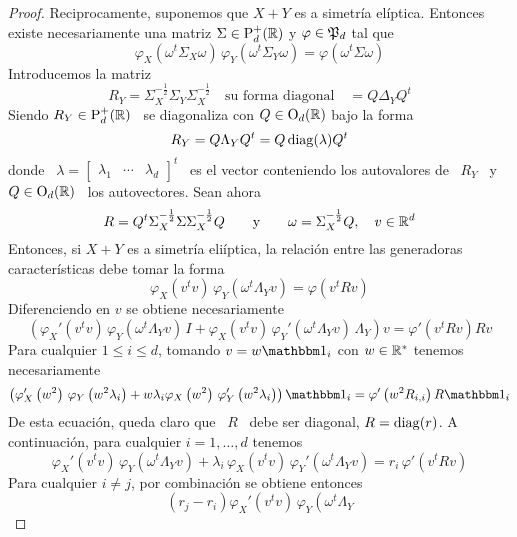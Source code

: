 \begin{proof}
  Reciprocamente,  suponemos  que $X+Y$  es  a  simetr\'ia el\'iptica.  Entonces
  existe  necesariamente una matriz  $\Sigma \in  \mathrm{P}_d^+(\mathbb{R})$ y  $\varphi \in
  \mathfrak{P}_d$ tal que
  \[
  \varphi_X\left(  \omega^t \Sigma_X  \omega\right) \,  \varphi_Y\left( \omega^t
    \Sigma_Y \omega\right) = \varphi\left( \omega^t \Sigma \omega\right)
  \]
  Introducemos la matriz
  \[
  R_Y  = \Sigma_X^{-\frac12} \Sigma_Y  \Sigma_X^{-\frac12} \quad  \mbox{su forma
    diagonal} \quad = Q \Delta_Y Q^t
  \]
  Siendo $R_Y \in \mathrm{P}_d^+(\mathbb{R})$ \ se diagonaliza con $Q \in \mathrm{O}_d(\mathbb{R})$ bajo la
  forma~\cite{Bha97, Bha07, HorJoh13}
  \[
  R_Y = Q \Lambda_Y Q^t = Q \operatorname{diag}(\lambda) Q^t
  \]
  donde    \    $\lambda    =    \begin{bmatrix}   \lambda_1    &    \cdots    &
    \lambda_d \end{bmatrix}^t$ \  es el vector conteniendo los  autovalores de \
  $R_Y$ \ y \ $Q \in \mathrm{O}_d(\mathbb{R})$ \ los autovectores. Sean ahora
  \[
  R  =  Q^t \Sigma_X^{-\frac12}  \Sigma  \Sigma_X^{-\frac12}  Q \qquad  \mbox{y}
  \qquad \omega = \Sigma_X^{-\frac12} Q, \quad v \in \mathbb{R}^d
  \]
  Entonces,  si $X+Y$  es  a  simetr\'ia eli\'iptica,  la  relaci\'on entre  las
  generadoras caracter\'isticas debe tomar la forma
  \[
  \varphi_X\left( v^t v \right)  \, \varphi_Y\left( \omega^t \Lambda_Y v \right)
  = \varphi\left( v^t R v \right)
  \]
  Diferenciendo en $v$ se obtiene necesariamente
  \[
  \left( \varphi_X'\left( v^t v  \right) \, \varphi_Y\left( \omega^t \Lambda_Y v
    \right) \,  I + \varphi_X\left(  v^t v \right) \,  \varphi_Y'\left( \omega^t
      \Lambda_Y  v \right)  \,  \Lambda_Y \right)  v  = \varphi'\left(  v^t R  v
  \right) R v
  \]
  Para cualquier  $1 \le  i \le d$,  tomando $v  = w \un_i$  con $w  \in \mathbb{R}^*$
  tenemos necesariamente
  \[
  \left( \varphi_X'\left( w^2  \right) \, \varphi_Y\left( w^2  \lambda_i
    \right)  + w \lambda_i \varphi_X\left(  w^2 \right) \,  \varphi_Y'\left( w^2 
      \lambda_i \right)   \right)  \un_i  = \varphi'\left(  w^2 R_{i,i}
  \right) R \un_i
  \]
  De esta ecuaci\'on, queda claro que \ $R$ \ debe ser diagonal, $R = \operatorname{diag}(r)$.
  A continuaci\'on, para cualquier $i = 1 , \ldots , d$ tenemos
  \[
  \varphi_X'\left( v^t v \right) \, \varphi_Y\left( \omega^t \Lambda_Y v \right)
  +  \lambda_i \,  \varphi_X\left( v^t  v \right)  \,  \varphi_Y'\left( \omega^t
    \Lambda_Y v \right) = r_i \, \varphi'\left( v^t R v \right)
  \]
  Para cualquier $i \ne j$, por combinaci\'on se obtiene entonces
  \[
  (r_j-r_i) \varphi_X'\left( v^t v \right) \, \varphi_Y\left( \omega^t \Lambda_Y
\]
\end{proof}
